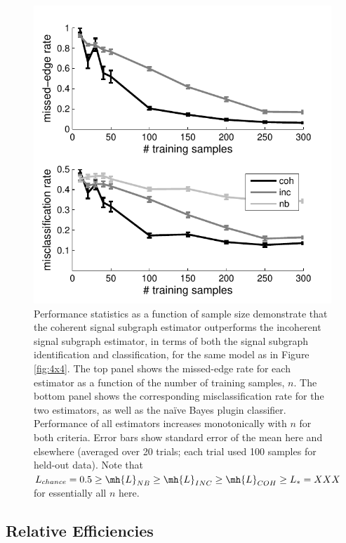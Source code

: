 \documentclass[10pt,journal,cspaper,compsoc]{IEEEtran}
\begin{document}
\begin{figure}[htbp]
	\centering
		\includegraphics[width=1.0\linewidth]{../figs/homo_V70_s20_p10_q30_Lhats.pdf}
	\caption{Performance statistics as a function of sample size demonstrate that the coherent signal subgraph estimator outperforms the incoherent signal subgraph estimator, in terms of both the signal subgraph identification and classification, for the same model as in Figure \ref{fig:4x4}.  The top panel shows the missed-edge rate for each estimator as a function of the number of training samples, $n$.  The bottom panel shows the corresponding misclassification rate for the two estimators, as well as the na\"{i}ve Bayes plugin classifier.  Performance of all estimators increases monotonically with $n$ for both criteria.  Error bars show standard error of the mean here and elsewhere (averaged over 20 trials; each trial used 100 samples for held-out data). Note that $L_{chance} = 0.5 \geq \mh{L}_{NB} \geq \mh{L}_{INC} \geq \mh{L}_{COH} \geq L_* = XXX$ for essentially all $n$ here.}
	\label{fig:homo}
\end{figure}


\subsection{Relative Efficiencies} %
\label{sub:relative_efficiencies}
\end{document}
